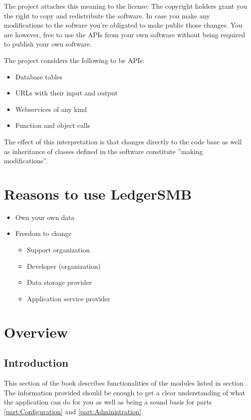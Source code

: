 The project attaches this meaning to the license:
The copyright holders grant you the right to copy and
redistribute the software.  In case you make any modifications to the sofware
you're obligated to make public those changes.  You are however, free to use
the APIs from your own software without being required to publish your own software.

The project considers the following to be APIs:
\begin{itemize}
\item Database tables
\item URLs with their input and output
\item Webservices of any kind
\item Function and object calls
\end{itemize}

The effect of this interpretation is that changes directly to the code base as
well as inheritance of classes defined in the software constitute ''making modifications''.

\chapter{Reasons to use LedgerSMB}

\begin{itemize}
\item Own your own data
\item Freedom to change
	\begin{itemize}
	\item Support organization
	\item Developer (organization)
	\item Data storage provider
	\item Application service provider
	\end{itemize}
\end{itemize}

\chapter{Overview}

\section{Introduction}
This section of the book describes functionalities of the modules listed in section .  The information provided should be enough to get a clear
understanding of what the application can do for you as well as being a sound basis
for parts \ref{part:Configuration} and \ref{part:Administration}.

